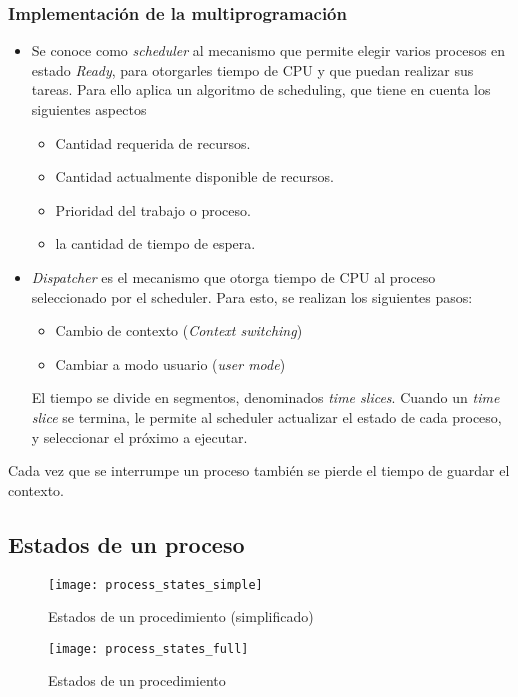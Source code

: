 \documentclass[a4paper, twoside]{article}
\begin{document}
\subsubsection{Implementación de la multiprogramación}
\begin{itemize}
	\item Se conoce como \emph{scheduler} al mecanismo que permite elegir varios procesos en estado \emph{Ready}, para otorgarles tiempo de CPU y que puedan realizar sus tareas. Para ello aplica un algoritmo de scheduling, que tiene en cuenta los siguientes aspectos
	\begin{itemize}
		\item Cantidad requerida de recursos.
		\item Cantidad actualmente disponible de recursos.
		\item Prioridad del trabajo o proceso.
		\item la cantidad de tiempo de espera.
	\end{itemize}
	
	\item \emph{Dispatcher} es el mecanismo que otorga tiempo de CPU al proceso seleccionado por el scheduler. Para esto, se realizan los siguientes pasos:
	\begin{itemize}
		\item Cambio de contexto (\emph{Context switching})
		\item Cambiar a modo usuario (\emph{user mode})
	\end{itemize}
	El tiempo se divide en segmentos, denominados \emph{time slices}. Cuando un \emph{time slice} se termina, le permite al scheduler actualizar el estado de cada proceso, y seleccionar el próximo a ejecutar.
\end{itemize}

Cada vez que se interrumpe un proceso también se pierde el tiempo de guardar el contexto.

\subsection{Estados de un proceso}
\begin{figure}[H]
	\centering
	\texttt{[image: process\_states\_simple]}
	\caption{Estados de un procedimiento (simplificado)}
	\label{fig:process_states_simple}
\end{figure}

\begin{figure}[H]
	\centering
	\texttt{[image: process\_states\_full]}
	\caption{Estados de un procedimiento}
	\label{fig:process_states_full}
\end{figure}
\end{document}

